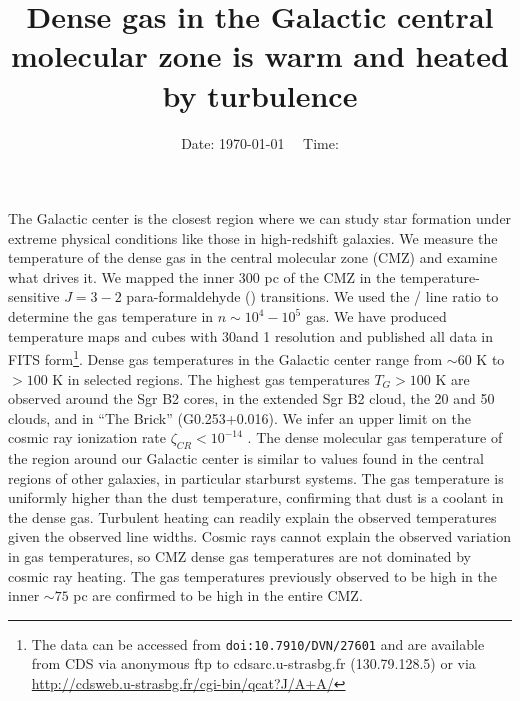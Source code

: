 



\title{Dense gas in the Galactic central molecular zone is warm and heated by turbulence}


\date{Date: \today ~~ Time: \currenttime}

\abstract
{The Galactic center is the closest region where we can study star formation
under extreme physical conditions like those in high-redshift galaxies.
}
{We measure the temperature of the dense gas in the central molecular zone
(CMZ) and examine what drives it.}
{We mapped the inner 300 pc of the CMZ in the temperature-sensitive
$J=3-2$ para-formaldehyde (\para) transitions.  We used the 
\threetwoone / \threeohthree line ratio to determine the gas temperature in
$n\sim10^4-10^5$ \percc gas.  We have produced temperature maps and cubes with
30\arcsec and 1 \kms resolution and published all data in FITS
form\thanks{The data can be accessed from \texttt{doi:10.7910/DVN/27601} and
are available from CDS via anonymous ftp to cdsarc.u-strasbg.fr (130.79.128.5)
or via \url{http://cdsweb.u-strasbg.fr/cgi-bin/qcat?J/A+A/}}.}
{Dense gas temperatures in the Galactic center range from $\sim60$ K to $>100$
K in selected regions.  The highest gas temperatures $T_G>100$ K are
observed around the Sgr B2 cores, in the extended Sgr B2 cloud, the 20 \kms and
50 \kms clouds, and in ``The Brick'' (G0.253+0.016).  We infer an upper limit on
the cosmic ray ionization rate $\zeta_{CR}<10^{-14}$ \pers.  
}
{
The dense molecular gas temperature of the region around our
Galactic center is similar to values found in the central regions of other
galaxies, in particular starburst systems.  The gas temperature is uniformly
higher than the dust temperature, confirming that dust is a coolant in the
dense gas.  Turbulent heating can readily explain the observed temperatures
given the observed line widths.  Cosmic rays cannot explain the observed
variation in gas temperatures, so CMZ dense gas temperatures are not dominated
by cosmic ray heating.  The gas temperatures previously observed to be high
in the inner $\sim75$ pc are confirmed to be high in the entire CMZ.}



